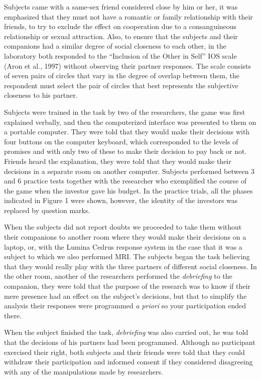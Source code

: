 \documentclass[12pt,]{article}
\begin{document}
Subjects came with a same-sex friend considered close by him or her, it
was emphasized that they must not have a romantic or family relationship
with their friends, to try to exclude the effect on cooperation due to a
consanguineous relationship or sexual attraction. Also, to ensure that
the subjects and their companions had a similar degree of social
closeness to each other, in the laboratory both responded to the
``Inclusion of the Other in Self'' IOS scale (Aron et al., 1997) without
observing their partner responses. The scale consists of seven pairs of
circles that vary in the degree of overlap between them, the respondent
must select the pair of circles that best represents the subjective
closeness to his partner.

Subjects were trained in the task by two of the researchers, the game
was first explained verbally, and then the computerized interface was
presented to them on a portable computer. They were told that they would
make their decisions with four buttons on the computer keyboard, which
corresponded to the levels of promises and with only two of these to
make their decision to pay back or not. Friends heard the explanation,
they were told that they would make their decisions in a separate room
on another computer. Subjects performed between 3 and 6 practice tests
together with the researcher who exemplified the course of the game when
the investor gave his budget. In the practice trials, all the phases
indicated in Figure 1 were shown, however, the identity of the investors
was replaced by question marks.

When the subjects did not report doubts we proceeded to take them
without their companions to another room where they would make their
decisions on a laptop, or, with the Lumina Cedrus response system in the
case that it was a subject to which we also performed MRI. The subjects
began the task believing that they would really play with the three
partners of different social closeness. In the other room, another of
the researchers performed the \emph{debriefing} to the companion, they
were told that the purpose of the research was to know if their mere
presence had an effect on the subject's decisions, but that to simplify
the analysis their responses were programmed \emph{a priori} so your
participation ended there.

When the subject finished the task, \emph{debriefing} was also carried
out, he was told that the decisions of his partners had been programmed.
Although no participant exercised their right, both subjects and their
friends were told that they could withdraw their participation and
informed consent if they considered disagreeing with any of the
manipulations made by researchers.
\end{document}
